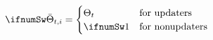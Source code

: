 \begin{equation*} \ifnumSw
  \bar{\Theta}_{t,i} =
\begin{cases}
   \Theta_{t} & \text{for updaters}
\\ \ifnumSw 1          & \text{for nonupdaters}
\end{cases}
\end{equation*}

